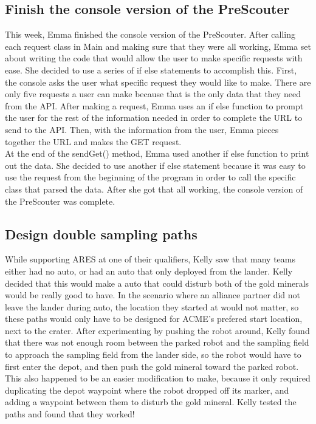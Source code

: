 \documentclass{article}
\begin{document}
\subsection{Finish the console version of the PreScouter}
This week, Emma finished the console version of the PreScouter. After calling each request class in Main and making sure that they were all working, Emma set about writing the code that would allow the user to make specific requests with ease. She decided to use a series of if else statements to accomplish this. First, the console asks the user what specific request they would like to make. There are only five requests a user can make because that is the only data that they need from the API. After making a request, Emma uses an if else function to prompt the user for the rest of the information needed in order to complete the URL to send to the API. Then, with the information from the user, Emma pieces together the URL and makes the GET request.\\

At the end of the sendGet() method, Emma used another if else function to print out the data. She decided to use another if else statement because it was easy to use the request from the beginning of the program in order to call the specific class that parsed the data. After she got that all working, the console version of the PreScouter was complete. \\


\subsection {Design double sampling paths}
While supporting ARES at one of their qualifiers, Kelly saw that many teams either had no auto, or had an auto that only deployed from the lander. Kelly decided that this would make a auto that could disturb both of the gold minerals would be really good to have. In the scenario where an alliance partner did not leave the lander during auto, the location they started at would not matter, so these paths would only have to be designed for ACME's prefered start location, next to the crater. After experimenting by pushing the robot around, Kelly found that there was not enough room between the parked robot and the sampling field to approach the sampling field from the lander side, so the robot would have to first enter the depot, and then push the gold mineral toward the parked robot. This also happened to be an easier modification to make, because it only required duplicating the depot waypoint where the robot dropped off its marker, and adding a waypoint between them to disturb the gold mineral. Kelly tested the paths and found that they worked!
\end{document}
